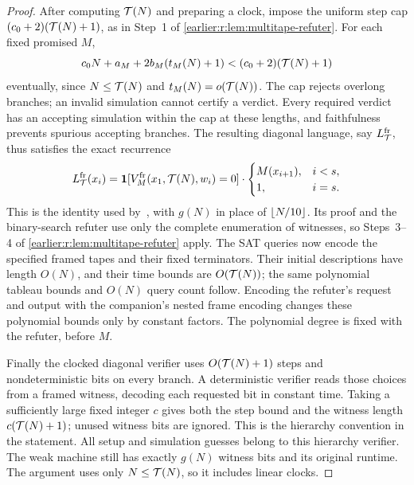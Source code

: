 \begin{proof}
After computing \(\mathcal T(N)\) and preparing a clock, impose the
uniform step cap \((c_0+2)(\mathcal T(N)+1)\), as in Step~1 of
\cref{earlier:r:lem:multitape-refuter}. For each fixed promised \(M\),
\[
 c_0N+a_M+2b_M(t_M(N)+1)
 <(c_0+2)(\mathcal T(N)+1)
\]
eventually, since \(N\le\mathcal T(N)\) and
\(t_M(N)=o(\mathcal T(N))\). The cap rejects overlong branches; an
invalid simulation cannot certify a verdict. Every required verdict
has an accepting simulation within the cap at these lengths, and
faithfulness prevents spurious accepting branches.
The resulting diagonal language, say \(L^{\rm fr}_{\mathcal T}\), thus
satisfies the exact recurrence
\[
 L^{\rm fr}_{\mathcal T}(x_i)=
 \mathbf 1[V_M^{\rm fr}(x_1,\mathcal T(N),w_i)=0]\cdot
 \begin{cases}
 M(x_{i+1}),&i<s,\\
 1,&i=s.
 \end{cases}
\]
This is the identity used by~\cite[Lemma~4.3 and Theorem~4.6]{CLW20},
with \(g(N)\) in place of \(\left\lfloor N/10\right\rfloor\). Its proof and the
binary-search refuter use only the complete enumeration of witnesses,
so Steps~3--4 of \cref{earlier:r:lem:multitape-refuter} apply. The SAT queries
now encode the specified framed tapes and their fixed terminators.
Their initial descriptions have length \(O(N)\), and their time
bounds are \(O(\mathcal T(N))\); the same polynomial tableau bounds and
\(O(N)\) query count follow. Encoding the refuter's request and output
with the companion's nested frame encoding changes these polynomial bounds
only by constant factors. The polynomial degree is fixed with the
refuter, before \(M\).

Finally the clocked diagonal verifier uses \(O(\mathcal T(N)+1)\) steps
and nondeterministic bits on every branch. A deterministic verifier
reads those choices from a framed witness, decoding each requested bit
in constant time. Taking a sufficiently large fixed integer \(c\)
gives both the step bound and the witness length
\(c(\mathcal T(N)+1)\); unused witness bits are ignored. This is the
hierarchy convention in the statement. All setup and simulation
guesses belong to this hierarchy verifier. The weak machine still has
exactly \(g(N)\) witness bits and its original runtime. The argument
uses only \(N\le\mathcal T(N)\), so it includes linear clocks.
\end{proof}

